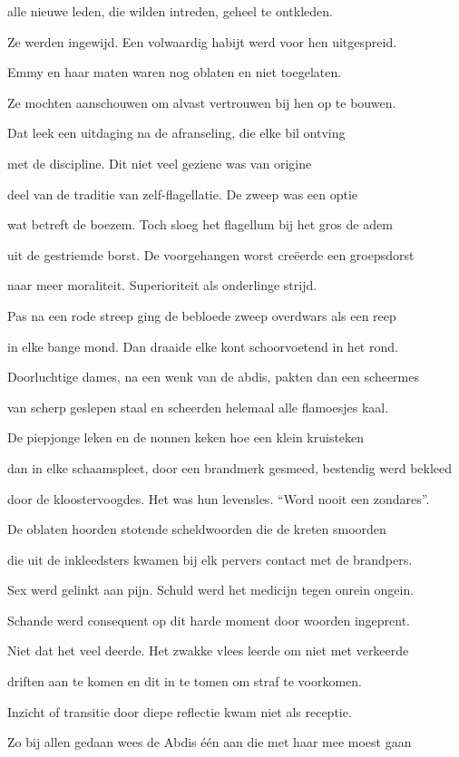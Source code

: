 alle nieuwe leden,
die wilden intreden,
geheel te ontkleden.

Ze werden ingewijd.
Een volwaardig habijt
werd voor hen uitgespreid.

Emmy en haar maten
waren nog oblaten
en niet toegelaten.

Ze mochten aanschouwen
om alvast vertrouwen
bij hen op te bouwen.

Dat leek een uitdaging
na de afranseling,
die elke bil ontving

met de discipline.
Dit niet veel geziene
was van origine

deel van de traditie
van zelf-flagellatie.
De zweep was een optie

wat betreft de boezem.
Toch sloeg het flagellum
bij het gros de adem

uit de gestriemde borst.
De voorgehangen worst
creëerde een groepsdorst

naar meer moraliteit.
Superioriteit
als onderlinge strijd.

Pas na een rode streep
ging de bebloede zweep
overdwars als een reep

in elke bange mond.
Dan draaide elke kont
schoorvoetend in het rond.

Doorluchtige dames,
na een wenk van de abdis,
pakten dan een scheermes

van scherp geslepen staal
en scheerden helemaal
alle flamoesjes kaal.

De piepjonge leken
en de nonnen keken
hoe een klein kruisteken

dan in elke schaamspleet,
door een brandmerk gesmeed,
bestendig werd bekleed

door de kloostervoogdes.
Het was hun levensles.
“Word nooit een zondares”.

De oblaten hoorden
stotende scheldwoorden
die de kreten smoorden

die uit de inkleedsters
kwamen bij elk pervers
contact met de brandpers.

Sex werd gelinkt aan pijn.
Schuld werd het medicijn
tegen onrein ongein.

Schande werd consequent
op dit harde moment
door woorden ingeprent.

Niet dat het veel deerde.
Het zwakke vlees leerde
om niet met verkeerde

driften aan te komen
en dit in te tomen
om straf te voorkomen.

Inzicht of transitie
door diepe reflectie
kwam niet als receptie.

Zo bij allen gedaan
wees de Abdis één aan
die met haar mee moest gaan

